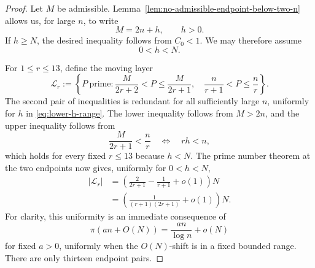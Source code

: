\documentclass[11pt]{article}
\numberwithin{equation}{section}
\theoremstyle{definition}
\theoremstyle{remark}
\newcommand{\1}{\mathbf 1}
\begin{document}
\begin{proof}
Let \(M\) be admissible.
Lemma~\ref{lem:no-admissible-endpoint-below-two-n} allows us, for large \(n\),
to write
\begin{equation}
                    M=2n+h,\qquad h>0.
                    \label{eq:lower-h-definition}
\end{equation}
If \(h\ge N\), the desired inequality follows from \(C_0<1\).  We may
therefore assume
\begin{equation}
                    0<h<N.
                    \label{eq:lower-h-range}
\end{equation}

For \(1\le r\le13\), define the moving layer
\begin{equation}
 \mathcal L_r:=
 \left\{P\ \text{prime}:
   \frac{M}{2r+2}<P\le\frac{M}{2r+1},
   \quad
   \frac{n}{r+1}<P\le\frac nr
 \right\}.
 \label{eq:moving-layers}
\end{equation}
The second pair of inequalities is redundant for all sufficiently large
\(n\), uniformly for \(h\) in \eqref{eq:lower-h-range}.  The lower
inequality follows from \(M>2n\), and the upper inequality follows from
\[
       \frac{M}{2r+1}<\frac nr
       \quad\Longleftrightarrow\quad rh<n,
\]
which holds for every fixed \(r\le13\) because \(h<N\).
The prime number theorem at the two endpoints now gives, uniformly for
\(0<h<N\),
\begin{equation}
 \begin{split}
 \lvert\mathcal L_r\rvert
  &=\left(\frac{2}{2r+1}-\frac{1}{r+1}+o(1)\right)N\\
  &=\left(\frac{1}{(r+1)(2r+1)}+o(1)\right)N.
 \end{split}
 \label{eq:moving-layer-count}
\end{equation}
For clarity, this uniformity is an immediate consequence of
\[
  \pi(an+O(N))=\frac{an}{\log n}+o(N)
\]
for fixed \(a>0\), uniformly when the \(O(N)\)-shift is in a fixed
bounded range.  There are only thirteen endpoint pairs.


\end{proof}
\end{document}

